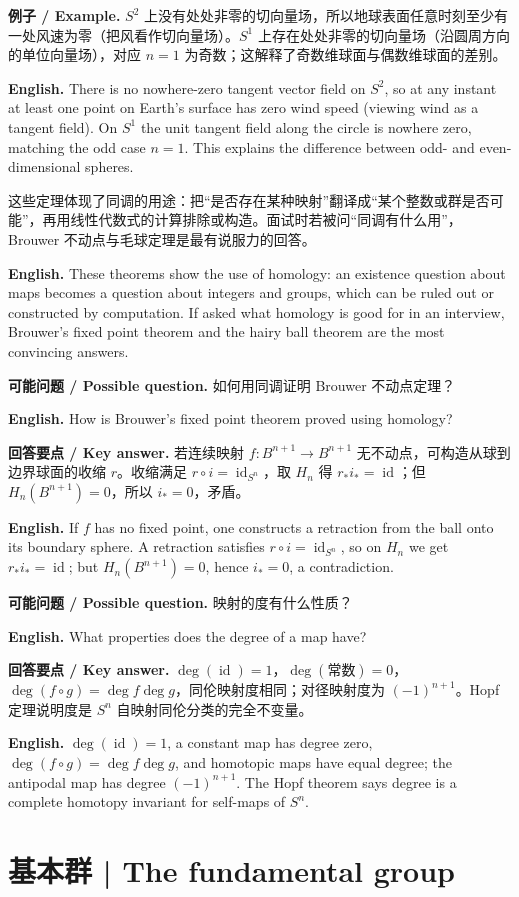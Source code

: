 \documentclass[UTF8,11pt,a4paper]{ctexart}
\newcommand{\EN}[1]{\par\noindent\textbf{English.} #1\par}
\newcommand{\EX}[2]{\par\noindent\textbf{例子 / Example.} #1\par\EN{#2}}
\newcommand{\ASK}[4]{\par\noindent\textbf{可能问题 / Possible question.} #1\par\EN{#2}\noindent\textbf{回答要点 / Key answer.} #3\par\EN{#4}\medskip}
\begin{document}
\EX{$S^2$ 上没有处处非零的切向量场，所以地球表面任意时刻至少有一处风速为零（把风看作切向量场）。$S^1$ 上存在处处非零的切向量场（沿圆周方向的单位向量场），对应 $n=1$ 为奇数；这解释了奇数维球面与偶数维球面的差别。}{There is no nowhere-zero tangent vector field on $S^2$, so at any instant at least one point on Earth's surface has zero wind speed (viewing wind as a tangent field). On $S^1$ the unit tangent field along the circle is nowhere zero, matching the odd case $n=1$. This explains the difference between odd- and even-dimensional spheres.}

\noindent 这些定理体现了同调的用途：把“是否存在某种映射”翻译成“某个整数或群是否可能”，再用线性代数式的计算排除或构造。面试时若被问“同调有什么用”，Brouwer 不动点与毛球定理是最有说服力的回答。
\EN{These theorems show the use of homology: an existence question about maps becomes a question about integers and groups, which can be ruled out or constructed by computation. If asked what homology is good for in an interview, Brouwer's fixed point theorem and the hairy ball theorem are the most convincing answers.}

\ASK{如何用同调证明 Brouwer 不动点定理？}{How is Brouwer's fixed point theorem proved using homology?}{若连续映射 $f:B^{n+1}\to B^{n+1}$ 无不动点，可构造从球到边界球面的收缩 $r$。收缩满足 $r\circ i=\operatorname{id}_{S^n}$，取 $H_n$ 得 $r_*i_*=\operatorname{id}$；但 $H_n(B^{n+1})=0$，所以 $i_*=0$，矛盾。}{If $f$ has no fixed point, one constructs a retraction from the ball onto its boundary sphere. A retraction satisfies $r\circ i=\operatorname{id}_{S^n}$, so on $H_n$ we get $r_*i_*=\operatorname{id}$; but $H_n(B^{n+1})=0$, hence $i_*=0$, a contradiction.}

\ASK{映射的度有什么性质？}{What properties does the degree of a map have?}{$\deg(\operatorname{id})=1$，$\deg(\text{常数})=0$，$\deg(f\circ g)=\deg f\deg g$，同伦映射度相同；对径映射度为 $(-1)^{n+1}$。Hopf 定理说明度是 $S^n$ 自映射同伦分类的完全不变量。}{$\deg(\operatorname{id})=1$, a constant map has degree zero, $\deg(f\circ g)=\deg f\deg g$, and homotopic maps have equal degree; the antipodal map has degree $(-1)^{n+1}$. The Hopf theorem says degree is a complete homotopy invariant for self-maps of $S^n$.}

\section{基本群 | The fundamental group}
\end{document}
